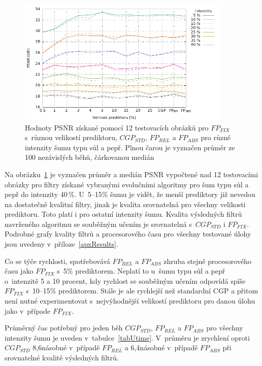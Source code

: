 \begin{figure}[hbt]
    \centering
    \includegraphics[width=0.9\textwidth]{fig/plot/compare/lineplot-psnr-sp-40.pdf}
    \caption{Hodnoty PSNR získané pomocí 12 testovacích obrázků pro $\mathit{FP_{FIX}}$ s~různou velikostí prediktoru, $\mathit{CGP_{STD}}$, $\mathit{FP_{REL}}$ a $\mathit{FP_{ABS}}$ pro různé intenzity šumu typu sůl a pepř. Plnou čarou je vyznačen průměr ze 100 nezávislých běhů, čárkovanou medián}
    \label{plotComparisonSP40}
\end{figure}

Na obrázku~\ref{plotComparisonSP40} je vyznačen průměr a medián PSNR vypočtené nad 12 testovacími obrázky pro filtry získané vybranými evolučními algoritmy pro šum typu sůl a pepř do intenzity 40\,\%. U~5--15\% šumu je vidět, že menší prediktory již nevedou na dostatečně kvalitní filtry, jinak je kvalita srovnatelná pro všechny velikosti prediktoru. Toto platí i pro ostatní intenzity šumu. Kvalita výsledných filtrů navrženého algoritmu se souběžným učením je srovnatelná s~$\mathit{CGP_{STD}}$ i $\mathit{FP_{FIX}}$. Podrobné grafy kvality filtrů a procesorového času pro všechny testované úlohy jsou uvedeny v~příloze~\ref{apxResults}.

Co se týče rychlosti, spotřebovává $\mathit{FP_{REL}}$ a $\mathit{FP_{ABS}}$ zhruba stejně procesorového času jako $\mathit{FP_{FIX}}$ s~5\% prediktorem. Neplatí to u~šumu typu sůl a pepř o~intenzitě 5 a 10 procent, kdy rychlost se souběžným učením odpovídá spíše $\mathit{FP_{FIX}}$ s~10--15\% prediktorem. Stále je ale rychlejší než standardní CGP a přitom není nutné experimentovat s~nejvýhodnější velikostí prediktoru pro danou úlohu jako v~případe $\mathit{FP_{FIX}}$.

Průměrný čas potřebný pro jeden běh $\mathit{CGP_{STD}}$, $\mathit{FP_{REL}}$ a $\mathit{FP_{ABS}}$ pro všechny intenzity šumu je uveden v~tabulce~\ref{tabUtime}. V~průměru je zrychlení oproti $\mathit{CGP_{STD}}$ 8,6násobné v~případě $\mathit{FP_{REL}}$ a 6,4násobné v~případě $\mathit{FP_{ABS}}$ při srovnatelné kvalitě výsledných filtrů.

